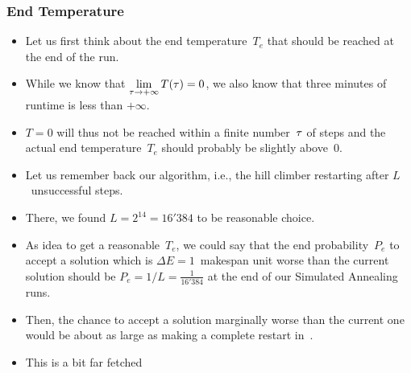 \documentclass[mathserif]{beamer}%
\begin{document}
\begin{frame}%
\frametitle{End Temperature}%
\begin{itemize}%
\item Let us first think about the end temperature~$T_e$ that should be reached at the end of the run.%
\item<2-> While we know that $\displaystyle{\lim_{\tau\rightarrow+\infty} T(\tau)=0}$, we also know that three minutes of runtime is less than $+\infty$.
\item<3-> $T=0$ will thus not be reached within a finite number~$\tau$ of steps and the actual end temperature~$T_e$ should probably be slightly above~0.%
\item<4-> Let us remember back our  algorithm, i.e., the  hill climber restarting after $L$~unsuccessful steps.%
\item<5-> There, we found $L=2^{14}=16'384$ to be reasonable choice.%
\item<6-> As idea to get a reasonable~$T_e$, we could say that the end probability~$P_e$ to accept a solution which is $\Delta E=1$~makespan unit worse than the current solution should be $P_e=1/L=\tfrac{1}{16'384}$ at the end of our Simulated Annealing runs.%
\item<7-> Then, the chance to accept a solution marginally worse than the current one would be about as large as making a complete restart in~.%
\item<8-> This is a bit far fetched%
\end{itemize}%
\end{frame}%
%
\setcounter{eqLast}{\value{equation}}%
%
\end{document}
